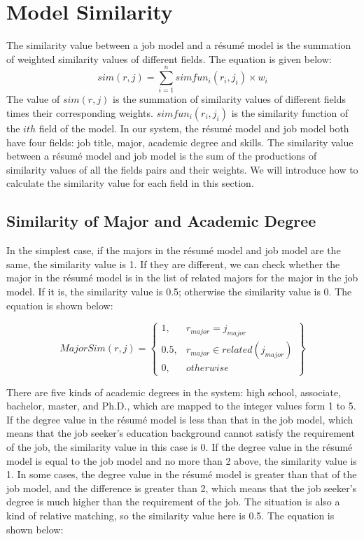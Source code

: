 

\section{Model Similarity}
\label{sec1}

The similarity value between a  job model and a r\'esum\'e model is the summation of weighted similarity values of different fields. The equation is given below:
$$ sim(r, j) = \sum_{i=1}^{n} simfun_i(r_i,j_i) \times w_i $$
The value of $sim(r, j)$ is the summation of similarity values of different fields times their corresponding weights. $simfun_i(r_i,j_i)$ is the similarity function of the $ith$ field of the model. In our system, the r\'esum\'e model and job model both have four fields: job title, major, academic degree and skills. The similarity value between a r\'esum\'e model and job model is the sum of the productions of similarity values of all the fields pairs and their weights. We will introduce how to calculate the similarity value for each field in this section.
 
\subsection{Similarity of Major and Academic Degree}

In the simplest case, if the majors in the r\'esum\'e model and job model are the same, the similarity value is 1. If they are different, we can check whether the major in the r\'esum\'e model is in the list of related majors for the major in the job model. If it is, the similarity value is 0.5; otherwise the similarity value is 0. The equation is shown below:

$$ MajorSim(r,j ) = \begin{Bmatrix}
1, & r_{major} = j_{major} \\
0.5, & r_{major} \in related( j_{major} ) \\
0, & otherwise
\end{Bmatrix} $$

There are five kinds of academic degrees in the system:  high school, associate, bachelor, master, and Ph.D., which are mapped to the integer values form 1 to 5. If the degree value in the r\'esum\'e model is less than that in the job model, which means that the job seeker's education background cannot satisfy the requirement of the job, the similarity value in this case is 0. If the degree value in the r\'esum\'e model is equal to the job model and no more than 2 above, the similarity value is 1. In some cases, the degree value in the r\'esum\'e model is greater than that of the job model, and the difference is greater than 2, which means that the job seeker's degree is much higher than the requirement of the job. The situation is also a kind of relative matching, so the similarity value here is 0.5. The equation is shown below:

